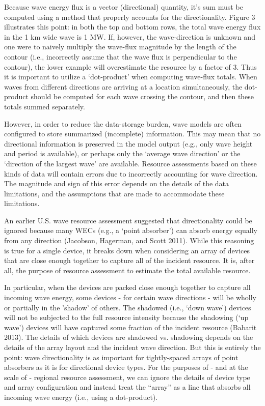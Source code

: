 \documentclass[authoryear,preprint]{elsarticle}
\begin{document}
Because wave energy flux is a vector (directional) quantity, it’s sum must be computed using a method that properly accounts for the directionality. Figure 3 illustrates this point: in both the top and bottom rows, the total wave energy flux in the 1 km wide wave is 1 MW. If, however, the wave-direction is unknown and one were to naively multiply the wave-flux magnitude by the length of the contour (i.e., incorrectly assume that the wave flux is perpendicular to the contour), the lower example will overestimate the resource by a factor of 3. Thus it is important to utilize a ‘dot-product’ when computing wave-flux totals. When waves from different directions are arriving at a location simultaneously, the dot-product should be computed for each wave crossing the contour, and then these totals summed separately.

However, in order to reduce the data-storage burden, wave models are often configured to store summarized (incomplete) information. This may mean that no directional information is preserved in the model output (e.g., only wave height and period is available), or perhaps only the ‘average wave direction’ or the ‘direction of the largest wave’ are available. Resource assessments based on these kinds of data will contain errors due to incorrectly accounting for wave direction. The magnitude and sign of this error depends on the details of the data limitations, and the assumptions that are made to accommodate these limitations.

An earlier U.S. wave resource assessment suggested that directionality could be ignored because many WECs (e.g., a ‘point absorber’) can absorb energy equally from any direction (Jacobson, Hagerman, and Scott 2011). While this reasoning is true for a single device, it breaks down when considering an array of devices that are close enough together to capture all of the incident resource. It is, after all, the purpose of resource assessment to estimate the total available resource.

In particular, when the devices are packed close enough together to capture all incoming wave energy, some devices - for certain wave directions - will be wholly or partially in the ’shadow’ of others. The shadowed (i.e., ‘down wave’) devices will not be subjected to the full resource intensity because the shadowing (‘up wave’) devices will have captured some fraction of the incident resource (Babarit 2013). The details of which devices are shadowed vs. shadowing depends on the details of the array layout and the incident wave direction. But this is entirely the point: wave directionality is as important for tightly-spaced arrays of point absorbers as it is for directional device types. For the purposes of - and at the scale of - regional resource assessment, we can ignore the details of device type and array configuration and instead treat the “array” as a line that absorbs all incoming wave energy (i.e., using a dot-product).
\end{document}
